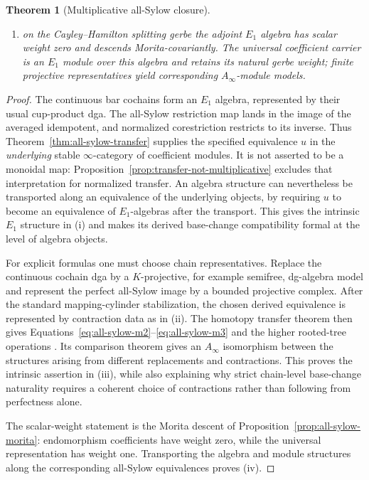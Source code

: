 \documentclass[11pt]{article}
\newtheorem{theorem}{Theorem}[section]
\theoremstyle{definition}
\begin{document}
\begin{theorem}[Multiplicative all-Sylow closure]
\begin{enumerate}[label=\textnormal{(\roman*)}]
\item on the Cayley--Hamilton splitting gerbe the adjoint $E_1$ algebra has scalar weight zero and descends Morita-covariantly.  The universal coefficient carrier is an $E_1$ module over this algebra and retains its natural gerbe weight; finite projective representatives yield corresponding $A_\infty$-module models.
\end{enumerate}
\end{theorem}

\begin{proof}
The continuous bar cochains form an $E_1$ algebra, represented by their usual cup-product dga.  The all-Sylow restriction map lands in the image of the averaged idempotent, and normalized corestriction restricts to its inverse.  Thus Theorem~\ref{thm:all-sylow-transfer} supplies the specified equivalence $u$ in the \emph{underlying} stable $\infty$-category of coefficient modules.  It is not asserted to be a monoidal map: Proposition~\ref{prop:transfer-not-multiplicative} excludes that interpretation for normalized transfer.  An algebra structure can nevertheless be transported along an equivalence of the underlying objects, by requiring $u$ to become an equivalence of $E_1$-algebras after the transport.  This gives the intrinsic $E_1$ structure in (i) and makes its derived base-change compatibility formal at the level of algebra objects.

For explicit formulas one must choose chain representatives.  Replace the continuous cochain dga by a $K$-projective, for example semifree, dg-algebra model and represent the perfect all-Sylow image by a bounded projective complex.  After the standard mapping-cylinder stabilization, the chosen derived equivalence is represented by contraction data as in (ii).  The homotopy transfer theorem then gives Equations~\eqref{eq:all-sylow-m2}--\eqref{eq:all-sylow-m3} and the higher rooted-tree operations \cite{BurkeTransfer,ManettiPerturbation,VokrinekHPT}.  Its comparison theorem gives an $A_\infty$ isomorphism between the structures arising from different replacements and contractions.  This proves the intrinsic assertion in (iii), while also explaining why strict chain-level base-change naturality requires a coherent choice of contractions rather than following from perfectness alone.

The scalar-weight statement is the Morita descent of Proposition~\ref{prop:all-sylow-morita}: endomorphism coefficients have weight zero, while the universal representation has weight one.  Transporting the algebra and module structures along the corresponding all-Sylow equivalences proves (iv).
\end{proof}
\end{document}
